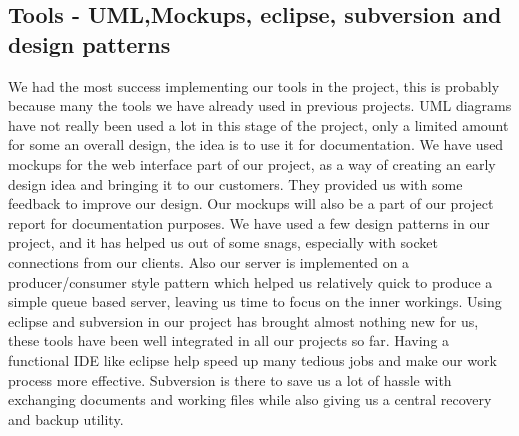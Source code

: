 \subsection*{Tools - UML,Mockups, eclipse, subversion and design patterns}
We had the most success implementing our tools in the project, this is probably because many the tools we have already used in previous projects.
UML diagrams have not really been used a lot in this stage of the project, only a limited amount for some an overall design, the idea is to use it for documentation.
We have used mockups for the web interface part of our project, as a way of creating an early design idea and bringing it to our customers.
They provided us with some feedback to improve our design. Our mockups will also be a part of our project report for documentation purposes.
We have used a few design patterns in our project, and it has helped us out of some snags, especially with socket connections from our clients.
Also our server is implemented on a producer/consumer style pattern which helped us relatively quick to produce a simple queue based server, leaving us time to focus on the inner workings.
Using eclipse and subversion in our project has brought almost nothing new for us, these tools have been well integrated in all our projects so far. Having a functional IDE like eclipse
help speed up many tedious jobs and make our work process more effective. Subversion is there to save us a lot of hassle with exchanging documents and working files while also giving us a central recovery
and backup utility.
